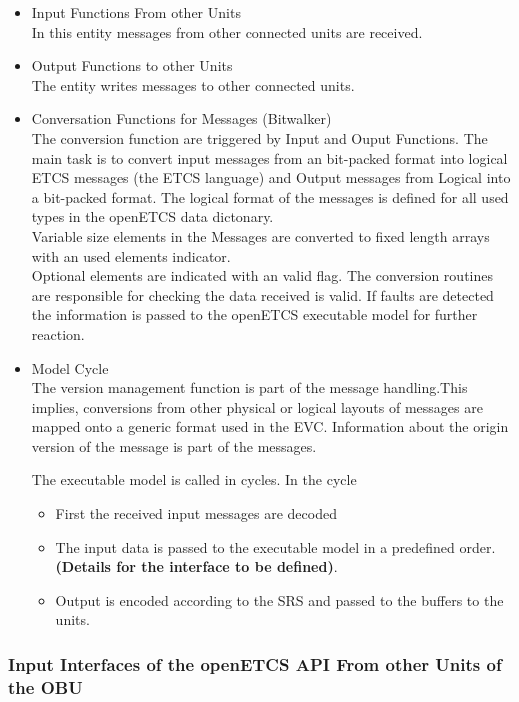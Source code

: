 \documentclass{template/openetcs_report}
\begin{document}
\begin{itemize}
\item Input Functions From other Units\\
In this entity messages from other connected units are received.
\item Output Functions to other Units\\
The entity writes messages to other connected units.
\item Conversation Functions for Messages (Bitwalker)\\
The conversion function are triggered by Input and Ouput Functions. The main task is to convert input messages from an bit-packed format into logical ETCS messages (the ETCS language) and Output messages from Logical into a bit-packed format. The logical format of the messages is defined for all used types in the openETCS data dictonary. \\
Variable size elements in the Messages are converted to fixed length arrays with an used elements indicator.\\
Optional elements are indicated with an valid flag.
The conversion routines are responsible for checking the data received is valid. If  faults are detected the information is passed to the openETCS executable model for further reaction. 
\item Model Cycle\\

The version management function is part of the message handling.This implies, conversions from other physical or logical layouts of messages are mapped onto a generic format used in the EVC. Information about the origin version of the message is part of the messages.
 
The executable model is called in cycles. In the cycle 
\begin{itemize}
\item First the received input messages are decoded
\item The input data is passed to the executable model in a predefined order. \textbf{(Details for the interface to be defined)}.
\item Output is encoded according to the \gls{SRS} and passed to the  buffers to the units.
\end{itemize}
\end{itemize}


\subsubsection{Input Interfaces of the openETCS API From other Units of the OBU}
\end{document}
